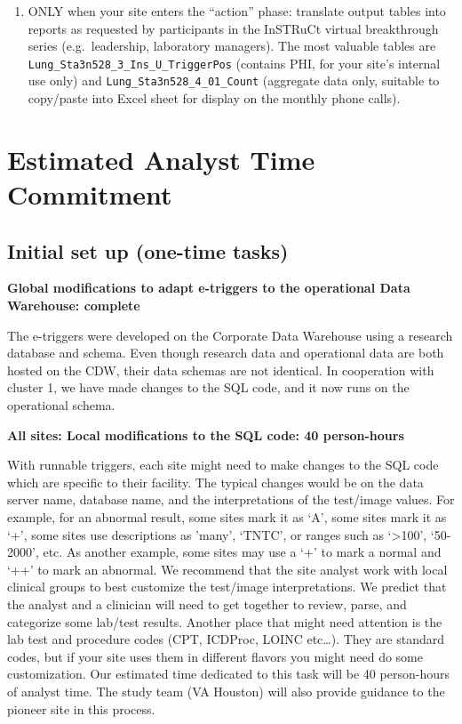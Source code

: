\documentclass{article}
\begin{document}
\begin{enumerate}
\item ONLY when your site enters the ``action'' phase: translate
  output tables into reports as requested by participants in the
  InSTRuCt virtual breakthrough series (e.g.\ leadership, laboratory
  managers). The most valuable tables are
  \texttt{Lung\_Sta3n528\_3\_Ins\_U\_TriggerPos} (contains PHI, for your site's
  internal use only) and \texttt{Lung\_Sta3n528\_4\_01\_Count} (aggregate data
  only, suitable to copy/paste into Excel sheet for display on the
  monthly phone calls).

\end{enumerate}




\section{Estimated Analyst Time Commitment}

\subsection{Initial set up (one-time tasks)}

\textbf{Global modifications to adapt e-triggers to the operational
  Data Warehouse: complete}

The e-triggers were developed on the Corporate Data Warehouse using a
research database and schema. Even though research data and
operational data are both hosted on the CDW, their data schemas are
not identical. In cooperation with cluster 1, we have made changes to
the SQL code, and it now runs on the operational schema.

\noindent\textbf{All sites: Local modifications to the SQL code: 40
  person-hours}

With runnable triggers, each site might need to make changes to the
SQL code which are specific to their facility. The typical changes
would be on the data server name, database name, and the
interpretations of the test/image values. For example, for an abnormal
result, some sites mark it as `A', some sites mark it as `+', some
sites use descriptions as 'many', `TNTC', or ranges such as
`\textgreater{}100', `50-2000', etc. As another example, some sites
may use a `+' to mark a normal and `++' to mark an abnormal. We
recommend that the site analyst work with local clinical groups to
best customize the test/image interpretations. We predict that the
analyst and a clinician will need to get together to review, parse,
and categorize some lab/test results. Another place that might need
attention is the lab test and procedure codes (CPT, ICDProc, LOINC
etc\ldots{}). They are standard codes, but if your site uses them in
different flavors you might need do some customization. Our estimated
time dedicated to this task will be 40 person-hours of analyst time.
The study team (VA Houston) will also provide guidance to the
pioneer site in this process.
\end{document}
